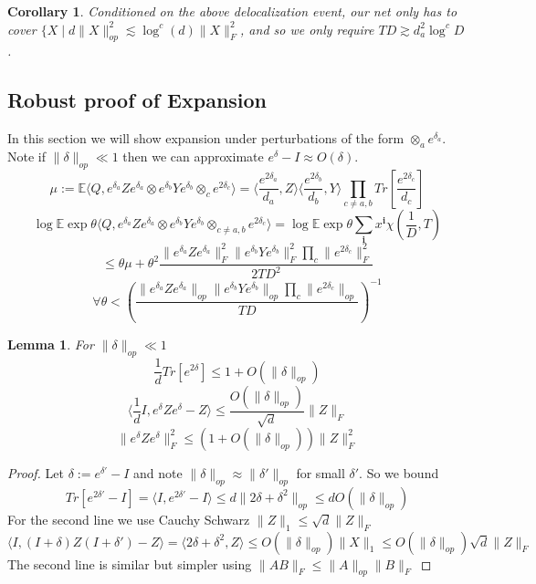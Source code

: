 \documentclass{article}
\newtheorem{corollary}[theorem]{Corollary}
\newtheorem{lemma}[theorem]{Lemma}
\renewcommand{\vec}{\bm}
\newcommand{\E}{\mathbb{E}}
\begin{document}
\begin{corollary}
Conditioned on the above delocalization event, our net only has to cover $\{X \mid d \|X\|_{op}^{2} \lesssim \log^{c}(d) \|X\|_{F}^{2}$, and so we only require $TD \gtrsim d_{a}^{2} \log^{c} D$.
\end{corollary}


\subsection{Robust proof of Expansion}
In this section we will show expansion under perturbations of the form $\otimes_{a} e^{\delta_{a}}$. Note if $\|\delta\|_{op} \ll 1$ then we can approximate $e^{\delta} - I \approx O(\delta)$.
\[ \mu := \E \langle Q, e^{\delta_{a}} Z e^{\delta_{a}} \otimes e^{\delta_{b}} Y e^{\delta_{b}} \otimes_{c} e^{2\delta_{c}} \rangle = \langle \frac{e^{2\delta_{a}}}{d_{a}} , Z \rangle \langle \frac{e^{2\delta_{b}}}{d_{b}}, Y \rangle \prod_{c \neq a,b} Tr[\frac{e^{2\delta_{c}}}{d_{c}} ]  \]
\[ \log \E \exp \theta \langle Q, e^{\delta_{a}} Z e^{\delta_{a}} \otimes e^{\delta_{b}} Y e^{\delta_{b}} \otimes_{c \neq a,b} e^{2\delta_{c}} \rangle = \log \E \exp \theta \sum_{\vec{i}} x^{\vec{i}} \chi(\frac{1}{D},T)   \]
\[ \leq \theta \mu + \theta^{2} \frac{\|e^{\delta_{a}} Z e^{\delta_{a}}\|_{F}^{2} \|e^{\delta_{b}} Y e^{\delta_{b}}\|_{F}^{2} \prod_{c} \|e^{2\delta_{c}}\|_{F}^{2}}{2 TD^{2}} \]
\[ \forall \theta < \left( \frac{\|e^{\delta_{a}} Z e^{\delta_{a}}\|_{op} \|e^{\delta_{b}} Y e^{\delta_{b}}\|_{op} \prod_{c} \|e^{2\delta_{c}}\|_{op}}{TD} \right)^{-1}    \]

\begin{lemma}
For $\|\delta\|_{op} \ll 1$
\[ \frac{1}{d} Tr[e^{2\delta}] \leq 1 + O(\|\delta\|_{op})  \]
\[ \langle \frac{1}{d} I, e^{\delta} Z e^{\delta} - Z \rangle \leq \frac{O(\|\delta\|_{op})}{\sqrt{d}} \|Z\|_{F}   \]
\[ \|e^{\delta} Z e^{\delta}\|_{F}^{2} \leq (1 + O(\|\delta\|_{op})) \|Z\|_{F}^{2}   \]
\end{lemma}
\begin{proof}
Let $\delta := e^{\delta'} - I$ and note $\|\delta\|_{op} \approx \|\delta'\|_{op}$ for small $\delta'$. So we bound
\[ Tr[e^{2\delta'} - I] = \langle I, e^{2\delta'} - I \rangle \leq d \|2\delta + \delta^{2}\|_{op} \leq d O(\|\delta\|_{op})   \]
For the second line we use Cauchy Schwarz $\|Z\|_{1} \leq \sqrt{d} \|Z\|_{F}$
\[ \langle I, (I + \delta) Z (I + \delta') - Z \rangle = \langle 2 \delta + \delta^{2}, Z \rangle \leq O(\|\delta\|_{op}) \|X\|_{1} \leq O(\|\delta\|_{op}) \sqrt{d} \|Z\|_{F}  \]
The second line is similar but simpler using $\|AB\|_{F} \leq \|A\|_{op} \|B\|_{F}$
\end{proof}
\end{document}
